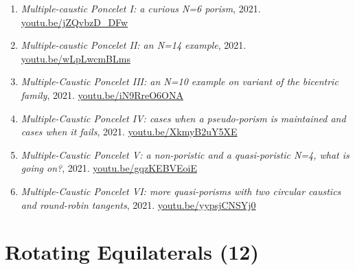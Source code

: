 \documentclass[12pt]{article}
\begin{document}
\begin{enumerate}[resume]
\item \textit{Multiple-caustic Poncelet I: a curious N=6 porism}, 2021. \href{https://youtu.be/jZQvbzD_DFw}{\url{youtu.be/jZQvbzD\_DFw}}
\item \textit{Multiple-caustic Poncelet II: an N=14 example}, 2021. \href{https://youtu.be/wLpLwcmBLms}{\url{youtu.be/wLpLwcmBLms}}
\item \textit{Multiple-Caustic Poncelet III: an N=10 example on variant of the bicentric family}, 2021. \href{https://youtu.be/iN9RreO6ONA}{\url{youtu.be/iN9RreO6ONA}}
\item \textit{Multiple-Caustic Poncelet IV: cases when a pseudo-porism is maintained and cases when it fails}, 2021. \href{https://youtu.be/XkmyB2uY5XE}{\url{youtu.be/XkmyB2uY5XE}}
\item \textit{Multiple-Caustic Poncelet V: a non-poristic and a quasi-poristic N=4, what is going on?}, 2021. \href{https://youtu.be/gqzKEBVEoiE}{\url{youtu.be/gqzKEBVEoiE}}
\item \textit{Multiple-Caustic Poncelet VI: more quasi-porisms with two circular caustics and round-robin tangents}, 2021. \href{https://youtu.be/yypsjCNSYj0}{\url{youtu.be/yypsjCNSYj0}}
\end{enumerate}

\section{Rotating Equilaterals (12)}
\end{document}
